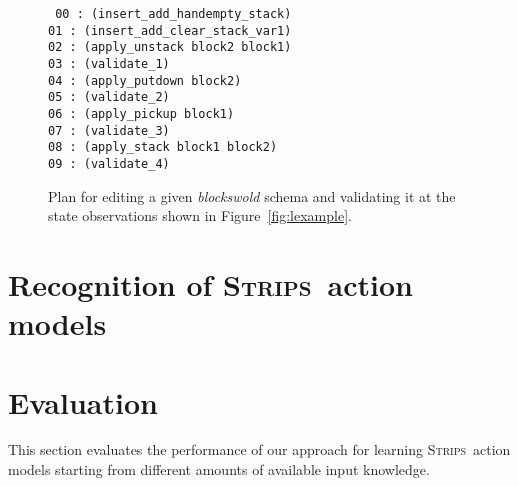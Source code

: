 \documentclass[3p,times]{elsarticle}
\newcommand{\strips}{\textsc{Strips}}     %
\begin{document}
\begin{figure}[hbt!]
{\tt\small
00 : (insert\_add\_handempty\_stack)\\
01 : (insert\_add\_clear\_stack\_var1)\\
02 : (apply\_unstack block2 block1)\\
03 : (validate\_1)\\
04 : (apply\_putdown block2)\\
05 : (validate\_2)\\
06 : (apply\_pickup block1)\\
07 : (validate\_3)\\
08 : (apply\_stack block1 block2)\\
09 : (validate\_4)\\
}
 \caption{\small Plan for editing a given {\em blockswold} schema and validating it at the state observations shown in Figure~\ref{fig:lexample}.}
\label{fig:plan-odistance}
\end{figure}



\section{Recognition of \strips\ action models}
\label{sec:Section7}



\section{Evaluation}
\label{sec:Section8}
This section evaluates the performance of our approach for learning \strips\ action models starting from different amounts of available input knowledge.
\end{document}
